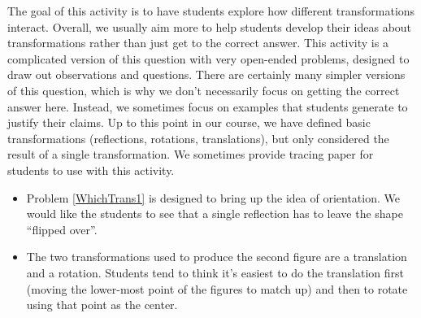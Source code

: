 \documentclass[nooutcomes]{ximera}
\begin{document}
\newpage
\begin{instructorNotes}

The goal of this activity is to have students explore how different transformations interact.  Overall, we usually aim more to help students develop their ideas about transformations rather than just get to the correct answer.  This activity is a complicated version of this question with very open-ended problems, designed to draw out observations and questions.  There are certainly many simpler versions of this question, which is why we don't necessarily focus on getting the correct answer here.  Instead, we sometimes focus on examples that students generate to justify their claims.  Up to this point in our course, we have defined basic transformations (reflections, rotations, translations), but only considered the result of a single transformation.  We sometimes provide tracing paper for students to use with this activity.


\begin{itemize}
    \item Problem \ref{WhichTrans1} is designed to bring up the idea of orientation.  We would like the students to see that a single reflection has to leave the shape ``flipped over''.  
    \item The two transformations used to produce the second figure are a translation and a rotation.  Students tend to think it's easiest to do the translation first (moving the lower-most point of the figures to match up) and then to rotate using that point as the center.
\end{itemize}



\end{instructorNotes}
\end{document}
